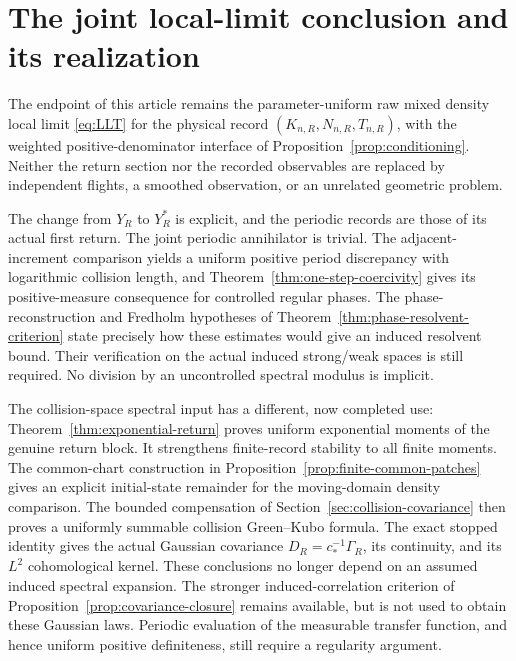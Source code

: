 \section{The joint local-limit conclusion and its realization}
\label{sec:final-realization}
The endpoint of this article remains the parameter-uniform raw mixed
density local limit \eqref{eq:LLT} for the physical record
$(K_{n,R},N_{n,R},T_{n,R})$, with the weighted positive-denominator
interface of Proposition~\ref{prop:conditioning}. Neither the return
section nor the recorded observables are replaced by independent flights,
a smoothed observation, or an unrelated geometric problem.

The change from $Y_R$ to $Y_R^*$ is explicit, and the periodic records
are those of its actual first return. The joint periodic annihilator is
trivial. The adjacent-increment comparison yields a uniform positive
period discrepancy with logarithmic collision length, and
Theorem~\ref{thm:one-step-coercivity} gives its positive-measure
consequence for controlled regular phases. The phase-reconstruction and
Fredholm hypotheses of Theorem~\ref{thm:phase-resolvent-criterion} state
precisely how these estimates would give an induced resolvent bound.
Their verification on the actual induced strong/weak spaces is still
required. No division by an uncontrolled spectral modulus is implicit.

The collision-space spectral input has a different, now completed use:
Theorem~\ref{thm:exponential-return} proves uniform exponential moments
of the genuine return block. It strengthens finite-record stability to
all finite moments. The common-chart construction in
Proposition~\ref{prop:finite-common-patches} gives an explicit
initial-state remainder for the moving-domain density comparison.
The bounded compensation of Section~\ref{sec:collision-covariance}
then proves a uniformly summable collision Green--Kubo formula. The
exact stopped identity gives the actual Gaussian covariance
$D_R=c_*^{-1}\Gamma_R$, its continuity, and its $L^2$ cohomological
kernel. These conclusions no longer depend on an assumed induced
spectral expansion. The stronger induced-correlation criterion of
Proposition~\ref{prop:covariance-closure} remains available, but is not
used to obtain these Gaussian laws. Periodic evaluation of the measurable
transfer function, and hence uniform positive definiteness, still
require a regularity argument.


